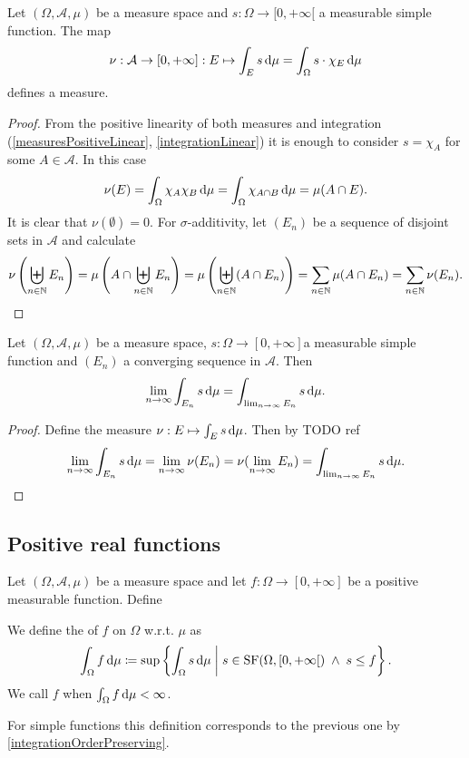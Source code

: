 \begin{proposition}
Let $(\Omega, \mathcal{A}, \mu)$ be a measure space and $s:\Omega\to [0,+\infty[$ a measurable simple function. The map
\[ \nu:\mathcal{A}\to [0,+\infty]: E\mapsto \int_E s\operatorname{d \!}{\mu} = \int_\Omega s\cdot \chi_E\operatorname{d \!}{\mu} \]
defines a measure.
\end{proposition}
\begin{proof}
From the positive linearity of both measures and integration (\ref{measuresPositiveLinear}, \ref{integrationLinear}) it is enough to consider $s = \chi_A$ for some $A\in\mathcal{A}$. In this case
\[ \nu(E) = \int_\Omega\chi_A\chi_B \operatorname{d \!}{\mu} = \int_\Omega\chi_{A\cap B} \operatorname{d \!}{\mu} = \mu(A\cap E). \]
It is clear that $\nu(\emptyset) = 0$. For $\sigma$-additivity, let $(E_n)$ be a sequence of disjoint sets in $\mathcal{A}$ and calculate
\[ \nu\left(\biguplus_{n\in\mathbb{N}}E_n\right) = \mu\left(A\cap \biguplus_{n\in\mathbb{N}}E_n\right) = \mu\left(\biguplus_{n\in\mathbb{N}}(A\cap E_n)\right) = \sum_{n\in\mathbb{N}}\mu(A\cap E_n) = \sum_{n\in\mathbb{N}}\nu(E_n). \]
\end{proof}
\begin{corollary} \label{integralContinuousInDomain}
Let $(\Omega, \mathcal{A}, \mu)$ be a measure space, $s:\Omega\to[0,+\infty]$a measurable simple function and $(E_n)$ a converging sequence in $\mathcal{A}$. Then
\[ \lim_{n\to\infty}\int_{E_n}s\operatorname{d \!}{\mu} = \int_{\lim_{n\to\infty} E_n}s\operatorname{d \!}{\mu}. \]
\end{corollary}
\begin{proof}
Define the measure $\nu: E\mapsto \int_E s\operatorname{d \!}{\mu}$. Then by TODO ref
\[ \lim_{n\to\infty}\int_{E_n}s\operatorname{d \!}{\mu} = \lim_{n\to\infty}\nu(E_n) = \nu(\lim_{n\to\infty}E_n) =\int_{\lim_{n\to\infty}E_n}s\operatorname{d \!}{\mu}. \]
\end{proof}

\subsection{Positive real functions}
\begin{definition}
Let $(\Omega, \mathcal{A}, \mu)$ be a measure space and let $f:\Omega\to[0,+\infty]$ be a positive measurable function. Define

We define the  of $f$ on $\Omega$ w.r.t. $\mu$ as
\[ \int_\Omega f \operatorname{d \!}{\mu} \coloneqq \sup\left\{ \int_\Omega s \operatorname{d \!}{\mu} \;\middle|\; s\in\operatorname{SF}(\Omega, [0,+\infty[)\;\land\; s\leq f \right\}. \]
We call $f$  when $\int_\Omega f \operatorname{d \!}{\mu} < \infty$.
\end{definition}
For simple functions this definition corresponds to the previous one by \ref{integrationOrderPreserving}.

